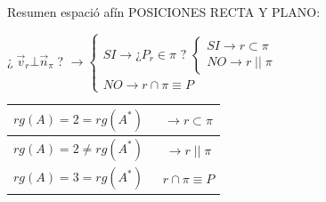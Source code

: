 \begin{myalertblock}{Resumen espació afín}
POSICIONES RECTA Y PLANO:

\vspace{2mm} ¿$\;\vec v_r \bot \vec n_{\pi} \;$? 
$\to \begin{cases} SI \to \text{¿} P_{r}\in \pi \text{ ? } 
 	\begin{cases} 
 	SI \to r \subset \pi \\ 
 	NO \to r \; || \; \pi 
 	\end{cases}
 \\ NO \longrightarrow r \cap \pi \equiv P	
 \end{cases}$
 
 \begin{table}[H]
 \centering
\begin{tabular}{|c|c|}
\hline
$rg(A)=2=rg(A^*)$      & $\;\;\to r \subset \pi $      \\ \hline
$rg(A)=2 \neq rg(A^*)$ & $\;\; \to r \;||\;\pi$        \\ \hline
$rg(A)=3=rg(A^*)$      & $\;\; r \cap \pi \equiv P$ \\ \hline
\end{tabular}
\end{table}

\end{myalertblock}









		










